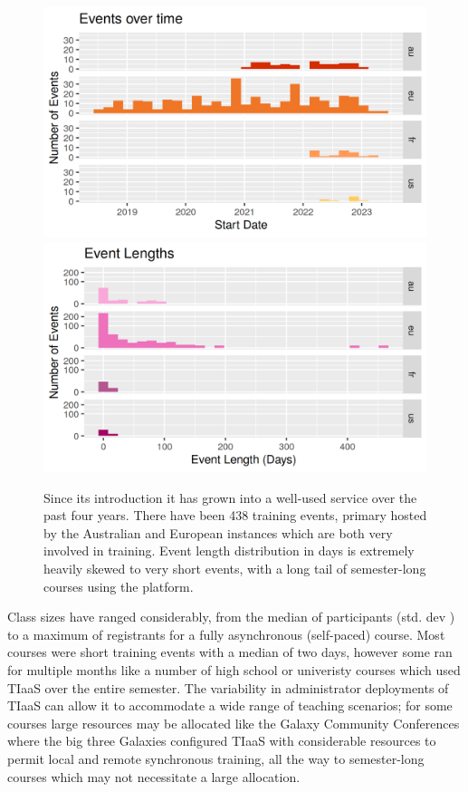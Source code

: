 \documentclass[a4paper,num-refs]{oup-contemporary}
\begin{document}
\begin{figure}[bt!]
\centering
	\includegraphics[width=\linewidth]{images/event-starts.png}
	\includegraphics[width=\linewidth]{images/event-lengths.png}
	\caption{Since its introduction it has grown into a well-used service over the past four years. There have been 438 training events, primary hosted by the Australian and European instances which are both very involved in training. Event length distribution in days is extremely heavily skewed to very short events, with a long tail of semester-long courses using the platform.}\label{figure:graphs}
\end{figure}


Class sizes have ranged considerably, from the median of  participants (std. dev \unskip) to a maximum of  registrants for a fully asynchronous (self-paced) course. Most courses were short training events with a median of two days, however some ran for multiple months like a number of high school or univeristy courses which used TIaaS over the entire semester. The variability in administrator deployments of TIaaS can allow it to accommodate a wide range of teaching scenarios; for some courses large resources may be allocated like the Galaxy Community Conferences where the big three Galaxies configured TIaaS with considerable resources to permit local and remote synchronous training, all the way to semester-long courses which may not necessitate a large allocation.
\end{document}
